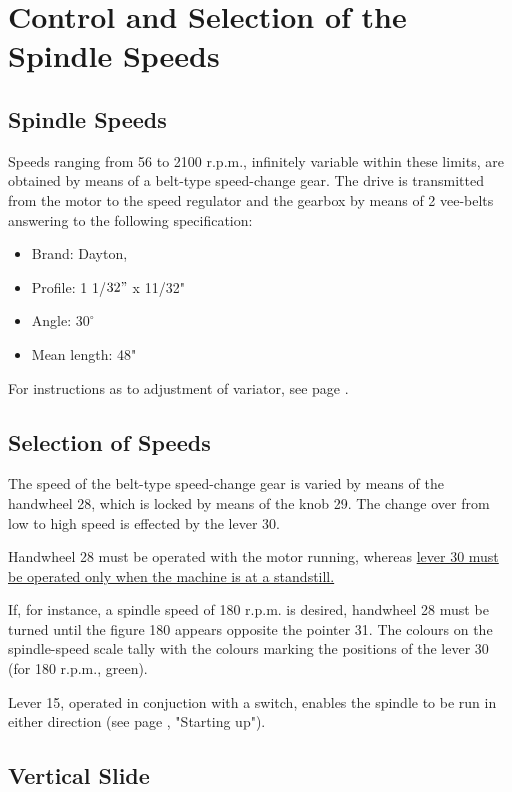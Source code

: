 \chapter{Control and Selection of the Spindle Speeds}
\section*{Spindle Speeds}

Speeds ranging from 56 to 2100 r.p.m., infinitely variable within
these limits, are obtained by means of a belt-type speed-change
gear. The drive is transmitted from the motor to the speed
regulator and the gearbox by means of 2 vee-belts answering to
the following specification:

\begin{itemize}
    \item Brand: Dayton,
    \item Profile: 1 1/\(32"\) x 11/32"
    \item Angle: \(30^\circ\)
    \item Mean length: 48"
\end{itemize}

For instructions as to adjustment of variator, see page \pageref{chap:spindle_speed_variator}.

\section*{Selection of Speeds}

The speed of the belt-type speed-change gear is varied by means
of the handwheel 28, which is locked by means of the knob 29.
The change over from low to high speed is effected by the lever 30.

Handwheel 28 must be operated with the motor running, whereas
\ul{lever 30 must be operated only when the machine is at a standstill.}

If, for instance, a spindle speed of 180 r.p.m. is desired,
handwheel 28 must be turned until the figure 180 appears opposite
the pointer 31. The colours on the spindle-speed scale tally with
the colours marking the positions of the lever 30 (for 180 r.p.m.,
green).

Lever 15, operated in conjuction with a switch, enables the
spindle to be run in either direction (see page \pageref{chap:structural_characteristics_and_handling}, "Starting up").

\section*{Vertical Slide}
